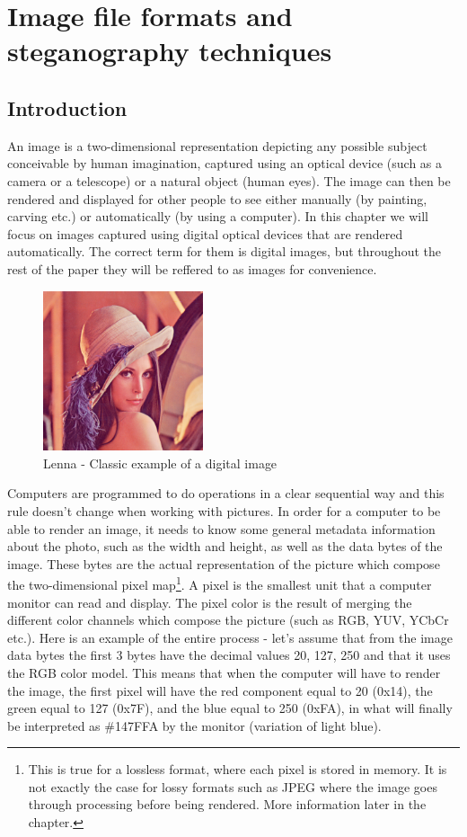 
\chapter{Image file formats and steganography techniques}

\section{Introduction}
An image is a two-dimensional representation depicting any possible subject conceivable by human imagination, captured using an optical device (such as a camera or a telescope) or a natural object (human eyes). The image can then be rendered and displayed for other people to see either manually (by painting, carving etc.) or automatically (by using a computer). In this chapter we will focus on images captured using digital optical devices that are rendered automatically. The correct term for them is digital images, but throughout the rest of the paper they will be reffered to as images for convenience.

\begin{figure}[H]
    \centering
    \includegraphics[width=4.7cm,keepaspectratio]{pics/lenna}
    \caption{Lenna - Classic example of a digital image}
    \label{Lenna}
\end{figure}

Computers are programmed to do operations in a clear sequential way and this rule doesn't change when working with pictures. In order for a computer to be able to render an image, it needs to know some general metadata information about the photo, such as the width and height, as well as the data bytes of the image. These bytes are the actual representation of the picture which compose the two-dimensional pixel map\footnote{This is true for a lossless format, where each pixel is stored in memory. It is not exactly the case for lossy formats such as JPEG where the image goes through processing before being rendered. More information later in the chapter.}. A pixel is the smallest unit that a computer monitor can read and display. The pixel color is the result of merging the different color channels which compose the picture (such as RGB, YUV, YCbCr etc.). Here is an example of the entire process - let's assume that from the image data bytes the first 3 bytes have the decimal values 20, 127, 250 and that it uses the RGB color model. This means that when the computer will have to render the image, the first pixel will have the red component equal to 20 (0x14), the green equal to 127 (0x7F), and the blue equal to 250 (0xFA), in what will finally be interpreted as \#147FFA by the monitor (variation of light blue). 

